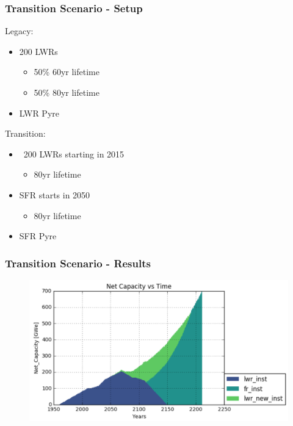 \begin{frame}
\frametitle{Transition Scenario - Setup}
Legacy:
\begin{itemize}
	\item 200 LWRs
	\begin{itemize}
		\item 50\% 60yr lifetime
		\item 50\% 80yr lifetime
	\end{itemize}
	\item LWR Pyre
\end{itemize}

Transition:
\begin{itemize}
	\item ~200 LWRs starting in 2015
	\begin{itemize}
		\item 80yr lifetime
	\end{itemize}
	\item SFR starts in 2050
	\begin{itemize}
		\item 80yr lifetime
	\end{itemize}
	\item SFR Pyre
\end{itemize}
\end{frame}

\begin{frame}
\frametitle{Transition Scenario - Results}
\begin{figure}
	\includegraphics[width=\linewidth]{images/netcap}
\end{figure}
\end{frame}

